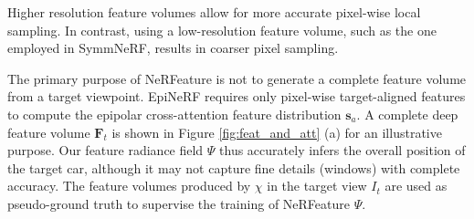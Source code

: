 Higher resolution feature volumes allow for more accurate pixel-wise local sampling. In contrast, using a low-resolution feature volume, such as the one employed in SymmNeRF, results in coarser pixel sampling.

The primary purpose of NeRFeature is not to generate a complete feature volume from a target viewpoint. EpiNeRF requires only pixel-wise target-aligned features to compute the epipolar cross-attention feature distribution $\mathbf{s}_{a}$. A complete deep feature volume $\mathbf{F}_{t}$ is shown in Figure \ref{fig:feat_and_att} (a) for an illustrative purpose. Our feature radiance field $\Psi$ thus accurately infers the overall position of the target car, although it may not capture fine details (\eg windows) with complete accuracy. The feature volumes produced by $\chi$ in the target view $I_{t}$ are used as pseudo-ground truth to supervise the training of NeRFeature $\Psi$. \newline

